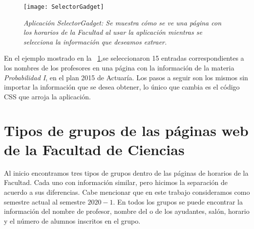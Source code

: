 \begin{figure}[h]
\centering
\texttt{[image: SelectorGadget]} %
\caption[\textit{Aplicación SelectorGadget}]{\textit{Aplicación SelectorGadget: Se muestra cómo se ve una página con los horarios de la Facultad al usar la aplicación mientras se selecciona la información que deseamos extraer.}}\label{appSelectorGadget}
\end{figure}

En el ejemplo mostrado en la \figurename{~\ref{appSelectorGadget}},se seleccionaron 15 entradas correspondientes a los nombres de los profesores en una página con la información de la materia \textit{Probabilidad I}, en el plan 2015 de Actuaría. Los pasos a seguir son los mismos sin importar la información que se desea obtener, lo único que cambia es el código CSS que arroja la aplicación.


\section{Tipos de grupos de las páginas web de la Facultad de Ciencias} \label{TiposDeGpos}

Al inicio encontramos tres tipos de grupos dentro de las páginas de horarios de la Facultad. Cada uno con información similar, pero hicimos la separación de acuerdo a sus diferencias. Cabe mencionar que en este trabajo consideramos como semestre actual al semestre $2020-1$. En todos los grupos se puede encontrar la información del nombre de profesor, nombre del o de los ayudantes, salón, horario y el número de alumnos inscritos en el grupo.

